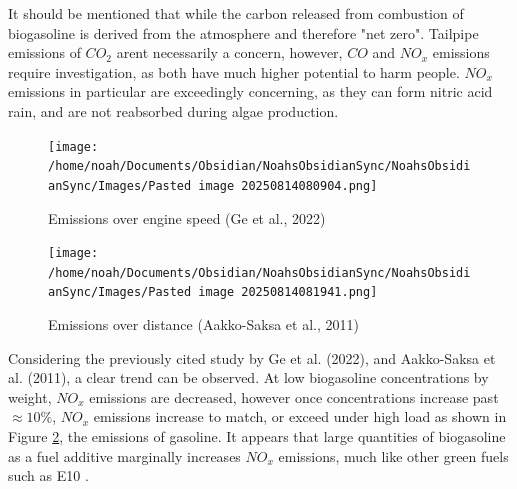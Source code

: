 \documentclass[10pt,a4paper]{article}
\begin{document}
	It should be mentioned that while the carbon released from combustion of
	biogasoline is derived from the atmosphere and therefore "net zero". 
	Tailpipe emissions of $CO_2$ aren\textquotesingle t necessarily a concern,
	however, $CO$ and $NO_x$ emissions require investigation, as both have much
	higher potential to harm people. $NO_x$ emissions in particular are
	exceedingly concerning, as they can form nitric acid rain, and are not
	reabsorbed during algae production. 
	
\begin{figure}[h]
	\centering
		\texttt{[image: /home/noah/Documents/Obsidian/NoahsObsidianSync/NoahsObsidianSync/Images/Pasted image 20250814080904.png]}\\
		\caption{Emissions over engine speed (Ge et al., 2022)}
		\label{EmissionsOverEngineSpeed}
\end{figure}

	
\begin{figure}[h]
	\centering
		\texttt{[image: /home/noah/Documents/Obsidian/NoahsObsidianSync/NoahsObsidianSync/Images/Pasted image 20250814081941.png]}\\
		\caption{Emissions over distance (Aakko-Saksa et al., 2011)}
		\label{EmissionsOverDistance}
\end{figure}

	
	Considering the previously cited study by Ge et al. (2022), and
	Aakko-Saksa et al. (2011), a clear trend can be observed.
	At low biogasoline concentrations by weight, $NO_x$ emissions are decreased, however once concentrations increase past $\approx 10\%$,	$NO_x$ emissions increase to match, or exceed under high load as shown in
	Figure 	\ref{EmissionsOverDistance}, the emissions of gasoline. It appears that large quantities of biogasoline as a fuel additive marginally increases $NO_x$ emissions, much like other \textquotesingle{}green\textquotesingle{} fuels such as \textquotesingle{} E10 \textquotesingle \cite{NSWGov_n.d.}.
\end{document}
